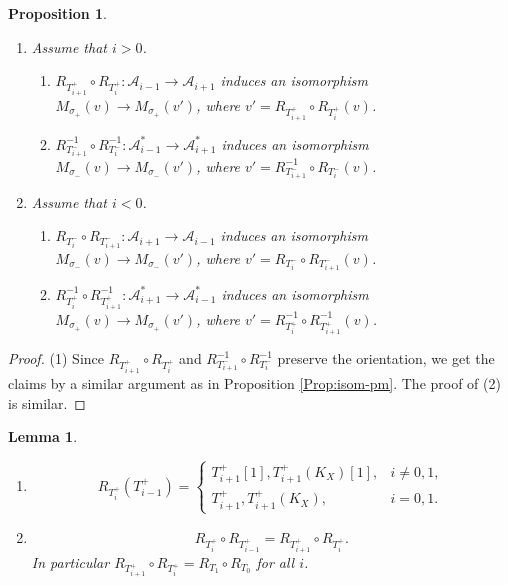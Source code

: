 \documentclass[leqno,11pt]{amsart}
\newtheorem{Prop}[Thm]{Proposition}
\newtheorem{Lem}[Thm]{Lemma}
\theoremstyle{definition}
\def\AA{\ensuremath{\mathcal A}}
\begin{document}
\begin{Prop}\label{Prop:isom-2}
\begin{enumerate}
\item[(1)]
Assume that $i>0$.
\begin{enumerate}
\item
$R_{T_{i+1}^+} \circ R_{T_i^+}:\AA_{i-1} \to \AA_{i+1}$
induces an isomorphism
$M_{\sigma_+}(v) \to M_{\sigma_+}(v')$, where 
$v'=R_{T_{i+1}^+} \circ R_{T_i^+}(v)$.
\item
$R_{T_{i+1}^-}^{-1} \circ R_{T_i^-}^{-1}:\AA_{i-1}^* \to \AA_{i+1}^*$
induces an isomorphism
$M_{\sigma_-}(v) \to M_{\sigma_-}(v')$, where
$v'=R_{T_{i+1}^-}^{-1} \circ R_{T_i^-}(v)$.
\end{enumerate}
\item[(2)]
Assume that $i < 0$.
\begin{enumerate}
\item
$R_{T_{i}^-} \circ R_{T_{i+1}^-}:\AA_{i+1} \to \AA_{i-1}$
induces an isomorphism
$M_{\sigma_-}(v) \to M_{\sigma_-}(v')$, where
$v'=R_{T_{i}^-} \circ R_{T_{i+1}^-}(v)$.
\item
$R_{T_{i}^+}^{-1} \circ R_{T_{i+1}^+}^{-1}:\AA_{i+1}^* \to \AA_{i-1}^*$
induces an isomorphism
$M_{\sigma_+}(v) \to M_{\sigma_+}(v')$, where
$v'=R_{T_{i}^+}^{-1} \circ R_{T_{i+1}^+}^{-1}(v)$.
\end{enumerate}
\end{enumerate}
\end{Prop}

\begin{proof}
(1)
Since $R_{T_{i+1}^+} \circ R_{T_i^+}$ and 
$R_{T_{i+1}^-}^{-1} \circ R_{T_i^-}^{-1}$
preserve the orientation,
we get the claims by a similar argument as in Proposition \ref{Prop:isom-pm}.  
The proof of (2) is similar.
\end{proof}



\begin{Lem}
\begin{enumerate}
\item[(1)]
\begin{equation}
R_{T_i^+}(T_{i-1}^+) =
\begin{cases}
T_{i+1}^+[1],T_{i+1}^+(K_X)[1], & i \ne 0,1,\\
T_{i+1}^+, T_{i+1}^+(K_X), & i =0,1.
\end{cases}
\end{equation}
\item[(2)]
\begin{equation}
R_{T_i^+} \circ R_{T_{i-1}^+}=R_{T_{i+1}^+} \circ R_{T_i^+}.
\end{equation}
In particular
$R_{T_{i+1}^+} \circ R_{T_i^+} =R_{T_1} \circ R_{T_0}$ for all $i$.
\end{enumerate}
\end{Lem}
\end{document}
